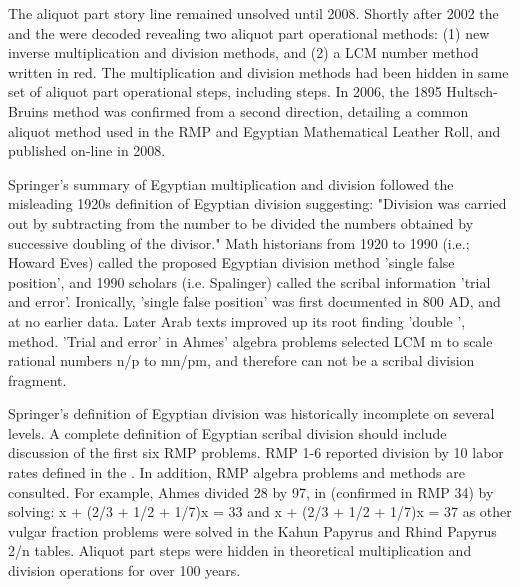 \documentclass[12pt]{article}
\begin{document}
The aliquot part story line remained unsolved until 2008. Shortly after 2002 the  and the  were decoded revealing two aliquot part operational methods: (1) new inverse multiplication and division methods, and (2) a LCM number method written in red. The multiplication and division methods had been hidden in same set of aliquot part operational steps, including  steps. In 2006, the 1895 Hultsch-Bruins method was confirmed from a second direction, detailing a common aliquot method used in the RMP and Egyptian Mathematical Leather Roll, and published on-line in 2008.

Springer's summary of Egyptian multiplication and division followed the misleading 1920s definition of Egyptian division suggesting: "Division was carried out by subtracting from the number to be divided the numbers obtained by successive doubling of the divisor." Math historians from 1920 to 1990 (i.e.; Howard Eves) called the proposed Egyptian division method 'single false position', and 1990 scholars (i.e. Spalinger) called the scribal information 'trial and error'. Ironically, 'single false position' was first documented in 800 AD, and at no earlier data. Later Arab texts improved up its root finding 'double  ', method. 'Trial and error' in Ahmes' algebra problems selected LCM m to scale rational numbers n/p to mn/pm, and therefore can not be a scribal division fragment.

Springer's definition of Egyptian division was historically incomplete on several levels. A complete definition of Egyptian scribal division should include discussion of the first six RMP problems. RMP 1-6 reported division by 10 labor rates defined in the . In addition, RMP algebra problems and methods are consulted. For example, Ahmes divided 28 by 97, in (confirmed in RMP 34) by solving:  x + (2/3 + 1/2 + 1/7)x = 33 and x + (2/3 + 1/2 + 1/7)x = 37 as other vulgar fraction problems were solved in the Kahun Papyrus and Rhind Papyrus 2/n tables. Aliquot part steps were hidden in theoretical multiplication and division operations for over 100 years. 
\end{document}
